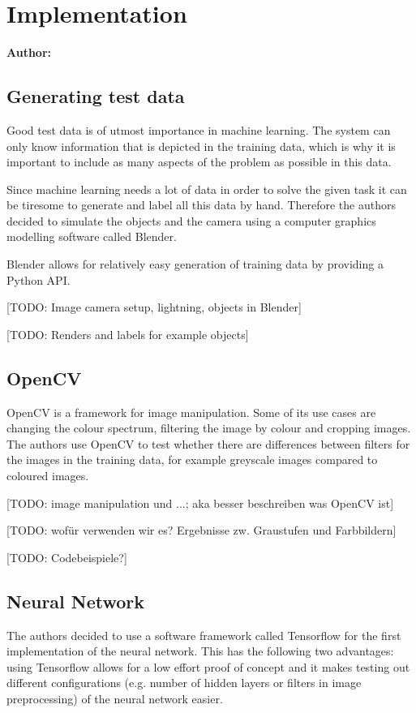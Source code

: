 \chapter{Implementation}

\textbf{Author: } 

\section{Generating test data}
Good test data is of utmost importance in machine learning. The system can only know information that is depicted in the training data, which is why it is important to include as many aspects of the problem as possible in this data.

Since machine learning needs a lot of data in order to solve the given task it can be tiresome to generate and label all this data by hand. Therefore the authors decided to simulate the objects and the camera using a computer graphics modelling software called Blender.

Blender allows for relatively easy generation of training data by providing a Python API.

[TODO: Image camera setup, lightning, objects in Blender]

[TODO: Renders and labels for example objects]

\section{OpenCV}
OpenCV is a framework for image manipulation. Some of its use cases are changing the colour spectrum, filtering the image by colour and cropping images. The authors use OpenCV to test whether there are differences between filters for the images in the training data, for example greyscale images compared to coloured images.

[TODO: image manipulation und ...; aka besser beschreiben was OpenCV ist]

[TODO: wofür verwenden wir es? Ergebnisse zw. Graustufen und Farbbildern]

[TODO: Codebeispiele?]

\section{Neural Network}
The authors decided to use a software framework called Tensorflow for the first implementation of the neural network. This has the following two advantages: using Tensorflow allows for a low effort proof of concept and it makes testing out different configurations (e.g. number of hidden layers or filters in image preprocessing) of the neural network easier.

